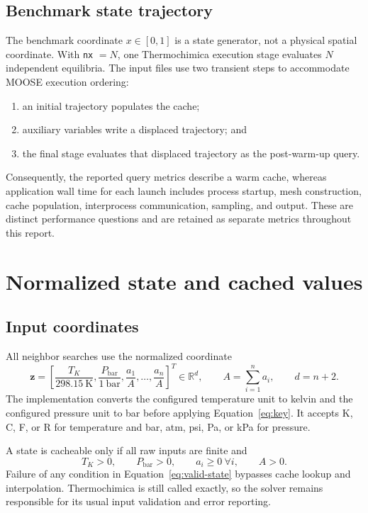 \documentclass[11pt]{article}
\newcommand{\R}{\mathbb{R}}
\newcommand{\code}[1]{\texttt{#1}}
\begin{document}
\subsection{Benchmark state trajectory}

The benchmark coordinate \(x\in[0,1]\) is a state generator, not a physical spatial coordinate.
With \code{nx} \(=N\), one Thermochimica execution stage evaluates \(N\) independent equilibria.
The input files use two transient steps to accommodate MOOSE execution ordering:
\begin{enumerate}[leftmargin=*]
  \item an initial trajectory populates the cache;
  \item auxiliary variables write a displaced trajectory; and
  \item the final stage evaluates that displaced trajectory as the post-warm-up query.
\end{enumerate}
Consequently, the reported query metrics describe a warm cache, whereas application wall time for
each launch includes process startup, mesh construction, cache population, interprocess
communication, sampling, and output.  These are distinct performance questions and are retained
as separate metrics throughout this report.

\section{Normalized state and cached values}

\subsection{Input coordinates}

All neighbor searches use the normalized coordinate
\begin{equation}
  \boldsymbol{z}
  =\left[
    \frac{T_K}{298.15\ \mathrm{K}},
    \frac{P_{\mathrm{bar}}}{1\ \mathrm{bar}},
    \frac{a_1}{A},\ldots,\frac{a_n}{A}
  \right]^T\in\R^d,
  \qquad
  A=\sum_{i=1}^{n}a_i,
  \qquad d=n+2.
  \label{eq:key}
\end{equation}
The implementation converts the configured temperature unit to kelvin and the configured pressure
unit to bar before applying Equation~\eqref{eq:key}.  It accepts K, C, F, or R for temperature and
bar, atm, psi, Pa, or kPa for pressure.

A state is cacheable only if all raw inputs are finite and
\begin{equation}
  T_K>0,\qquad P_{\mathrm{bar}}>0,\qquad a_i\geq 0\ \forall i,
  \qquad A>0.
  \label{eq:valid-state}
\end{equation}
Failure of any condition in Equation~\eqref{eq:valid-state} bypasses cache lookup and interpolation.
Thermochimica is still called exactly, so the solver remains responsible for its usual input
validation and error reporting.
\end{document}
